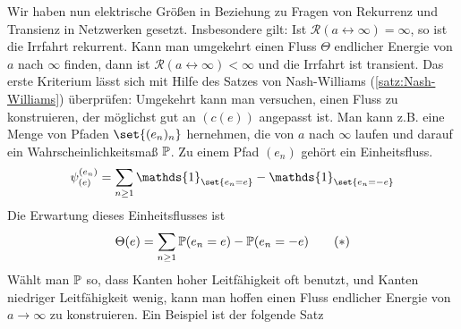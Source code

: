 Wir haben nun elektrische Größen in Beziehung zu Fragen von Rekurrenz und Transienz in Netzwerken gesetzt. Insbesondere gilt: Ist $\mathcal{R}(a \leftrightarrow \infty)  = \infty $, so ist die Irrfahrt rekurrent. Kann man umgekehrt einen Fluss $\Theta$ endlicher Energie von $a$ nach $\infty$ finden, dann ist $\mathcal{R}(a \leftrightarrow \infty)< \infty$ und die Irrfahrt ist transient. Das erste Kriterium lässt sich mit Hilfe des Satzes von Nash-Williams (\ref{satz:Nash-Williams}) überprüfen: Umgekehrt kann man versuchen, einen Fluss zu konstruieren, der möglichst gut an $(c(e))$ angepasst ist. Man kann z.B. eine Menge von Pfaden $\set{(e_n)_n}$ hernehmen, die von $a$ nach $\infty$ laufen und darauf ein Wahrscheinlichkeitsmaß $\mathbb{P}$. Zu einem Pfad $(e_n)$ gehört ein Einheitsfluss. 
\begin{align}
	\psi^{(e_n)}_{(e)} = \sum\limits_{n \geq 1} \mathds{1}_{\set{e_n = e}} - \mathds{1}_{\set{e_n = -e}}
\end{align}
Die Erwartung dieses Einheitsflusses ist
\begin{gather}
	\Theta(e) = \sum\limits_{n \geq 1} \prop{e_n = e} - \prop{e_n = -e} \tag{$*$}\label{eqn:4-1}
\end{gather}
Wählt man $\mathbb{P}$ so, dass Kanten hoher Leitfähigkeit oft benutzt, und Kanten niedriger Leitfähigkeit wenig, kann man hoffen einen Fluss endlicher Energie von $a \to \infty$ zu konstruieren. Ein Beispiel ist der folgende Satz

